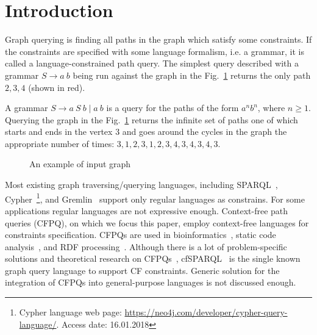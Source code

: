 \section{Introduction}

Graph querying is finding all paths in the graph which satisfy some constraints.
If the constraints are specified with some language formalism, i.e. a grammar, it is called a language-constrained path query. The simplest query described with a grammar $S \rightarrow a \ b$ being run against the graph in the Fig.~\ref{fig:exmplInputGraph} returns the only path $2, 3, 4$ (shown in red).

A grammar $S \rightarrow a \ S \ b \mid a \ b$ is a query for the paths of the form $a^n b^n$, where $n \geq 1$.
Querying the graph in the Fig.~\ref{fig:exmplInputGraph} returns the infinite set of paths one of which starts and ends in the vertex $3$ and goes around the cycles in the graph the appropriate number of times: $3,1,2,3,1,2,3,4,3,4,3,4,3$.

\begin{figure}[h]
\caption{An example of input graph}
\label{fig:exmplInputGraph}
\end{figure}

Most existing graph traversing/querying languages, including SPARQL~\cite{sparql}, Cypher~\footnote{Cypher language web page: \url{https://neo4j.com/developer/cypher-query-language/}. Access date: 16.01.2018}, and Gremlin~\cite{gremlin} support only regular languages as constrains.
For some applications regular languages are not expressive enough.
Context-free path queries (CFPQ), on which we focus this paper, employ context-free languages for constraints specification.
CFPQs are used in bioinformatics~\cite{GraphQueryWithEarley}, static code analysis~\cite{Reps, Zheng, LabelFlowCFLReachability, specificationCFLReachability, JavaCFL}, and RDF processing~\cite{CFGonRDF}.
Although there is a lot of problem-specific solutions and theoretical research on CFPQs~\cite{Yannakakis, ConjCFPathQuery, Hellings16, GrigorevR16, QueryGraphWithData, RegularDBQuery, GraphQueryWithEarley, graphDB}, cfSPARQL~\cite{CFGonRDF} is the single known graph query language to support CF constraints.
Generic solution for the integration of CFPQs into general-purpose languages is not discussed enough.

